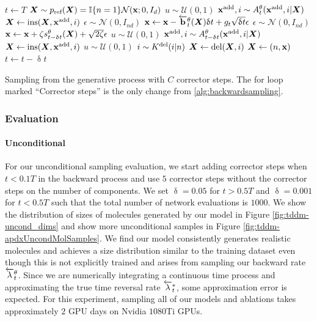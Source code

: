 \begin{algorithm}
\begin{algorithmic}[1]
    \State $t \leftarrow T$
    \State ${\bm{X}} \sim p_{\textup{ref}}({\bm{X}}) = \mathbb{I}\{ n=1\} \mathcal{N}({\mathbf{x}}; 0, I_{d})$
    \State $u \sim \mathcal{U}(0, 1)$
    \State ${\mathbf{x}}^{\textup{add}}, i \sim A_{t}^\theta({\mathbf{x}}^{\textup{add}}, i | {\bm{X}})$
    \State ${\bm{X}} \leftarrow \text{ins}({\bm{X}}, {\mathbf{x}}^{\textup{add}}, i)$
    \EndIf
    \State  $\epsilon \sim \mathcal{N}(0, I_{nd})$
    \State ${\mathbf{x}} \leftarrow {\mathbf{x}} - \overleftarrow{\mathbf{b}}_{t}^\theta({\bm{X}}) \updelta t + g_{t} \sqrt{\updelta t} \epsilon$
        \State $\epsilon \sim \mathcal{N}(0, I_{nd})$
        \State ${\mathbf{x}} \leftarrow {\mathbf{x}} + \zeta s_{t-\updelta t}^\theta({\bm{X}}) + \sqrt{2 \zeta} \epsilon$
        \State $u \sim \mathcal{U}(0, 1)$
        \State ${\mathbf{x}}^{\textup{add}}, i \sim A_{t-\updelta t}^\theta({\mathbf{x}}^{\textup{add}}, i | {\bm{X}})$
        \State ${\bm{X}} \leftarrow \text{ins}({\bm{X}}, {\mathbf{x}}^{\textup{add}}, i)$
        \EndIf
        \State $u \sim \mathcal{U}(0, 1)$
            \State $i \sim K^{\textup{del}}(i | n)$
            \State ${\bm{X}} \leftarrow \text{del}({\bm{X}}, i)$
        \EndIf
    \EndFor
    \State ${\bm{X}} \leftarrow (n, {\mathbf{x}})$
    \State $t \leftarrow t - \updelta t$
    \EndWhile
\end{algorithmic}
\caption{Sampling from the generative process with $C$ corrector steps. The for loop marked ``Corrector steps'' is the only change from \cref{alg:backwardsampling}.}
\label{alg:backwardsamplingWithCorrector}
\end{algorithm}

\subsubsection{Evaluation}
\paragraph{Unconditional}
For our unconditional sampling evaluation, we start adding corrector steps when $t<0.1T$ in the backward process and use $5$ corrector steps without the corrector steps on the number of components. We set $\updelta = 0.05$ for $ t > 0.5T$ and $\updelta = 0.001$ for $t<0.5T$ such that the total number of network evaluations is $1000$. We show the distribution of sizes of molecules generated by our model in Figure \ref{fig:tddm-uncond_dims} and show more unconditional samples in Figure \ref{fig:tddm-apdxUncondMolSamples}. We find our model consistently generates realistic molecules and achieves a size distribution similar to the training dataset even though this is not explicitly trained and arises from sampling our backward rate $\overleftarrow{\lambda}_t^\theta$. Since we are numerically integrating a continuous time process and approximating the true time reversal rate $\overleftarrow{\lambda}_t^*$, some approximation error is expected. For this experiment, sampling all of our models and ablations takes approximately $2$ GPU days on Nvidia $1080$Ti GPUs.

